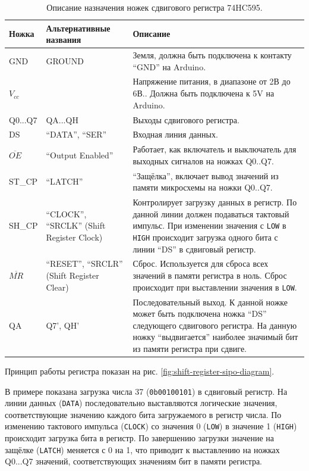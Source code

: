 \documentclass[../sparc.tex]{subfiles}
\begin{document}
\begin{table}[H]
  \centering
  \small
  \begin{tabular}{ | m{1.25cm} | m{2.75cm} | m{6.0cm} | }
    \hline
    \textbf{Ножка}
    & \textbf{Альтернативные названия}
    & \textbf{Описание} \\
    \hline
    GND
    & GROUND
    & Земля, должна быть подключена к контакту ``GND'' на Arduino. \\
    \hline
    $V_{cc}$
    &
    & Напряжение питания, в диапазоне от 2В до 6В.\cite{ti:sn74hc595}.
    Должна быть подключена к 5V на Arduino. \\
    \hline
    Q0...Q7
    & QA...QH
    & Выходы сдвигового регистра. \\
    \hline
    DS
    & ``DATA'', ``SER''
    & Входная линия данных. \\
    \hline
    $\overline{OE}$
    & ``Output Enabled''
    & Работает, как включатель и выключатель
    для выходных сигналов на ножках Q0..Q7. \\
    \hline
    ST\_CP
    & ``LATCH''
    & ``Защёлка'', включает вывод значений из
    памяти микросхемы на ножки Q0..Q7. \\
    \hline
    SH\_CP
    & ``CLOCK'', ``SRCLK'' (Shift Register Clock)
    & Контролирует загрузку данных в регистр.  По данной линии должен подаваться
    тактовый импульс. При изменении значения с \texttt{LOW} в \texttt{HIGH}
    происходит загрузка одного бита с линии ``DS'' в сдвиговый регистр. \\
    \hline
    $\overline{MR}$
    & ``RESET'', ``SRCLR'' (Shift Register Clear)
    & Сброс.  Используется для сброса всех значений в памяти регистра в ноль.
    Сброс происходит при выставлении значения в \texttt{LOW}. \\
    \hline
    QA
    & Q7', QH'
    & Последовательный выход.  К данной ножке может быть подключена ножка ``DS''
    следующего сдвигового регистра.  На данную ножку ``выдвигается'' наиболее
    значимый бит из памяти регистра при сдвиге. \\
    \hline
  \end{tabular}
  \caption{Описание назначения ножек сдвигового регистра 74HC595.}
  \label{table:shift-register-sipo-pins}
\end{table}

Принцип работы регистра показан на рис. \ref{fig:shift-register-sipo-diagram}.


В примере показана загрузка числа 37 (\texttt{0b00100101}) в сдвиговый
регистр.  На линии данных (\texttt{DATA}) последовательно выставляются
логические значения, соответствующие значению каждого бита загружаемого в
регистр числа.  По изменению тактового импульса (\texttt{CLOCK}) со значения 0
(\texttt{LOW}) в значение 1 (\texttt{HIGH}) происходит загрузка бита в регистр.
По завершению загрузки значение на защёлке (\texttt{LATCH}) меняется с 0 на 1,
что приводит к выставлению на ножках Q0...Q7 значений, соответствующих значениям
бит в памяти регистра.
\end{document}
